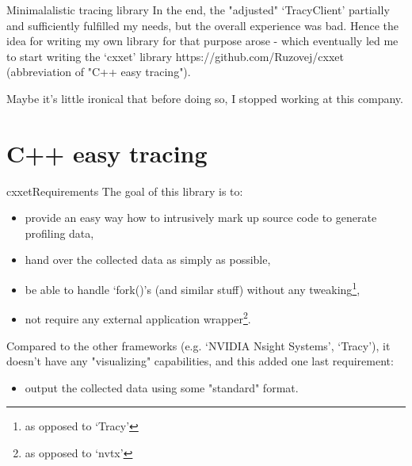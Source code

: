 \documentclass[aspectratio=169]{beamer}
\begin{document}
\begin{frame}{Minimalalistic tracing library}
    In the end, the "adjusted" `TracyClient' partially and sufficiently fulfilled my needs, but the overall experience was bad. Hence the idea for writing my own library for that purpose arose - which eventually led me to start writing the `cxxet' library https://github.com/Ruzovej/cxxet (abbreviation of "C++ easy tracing").
    
    Maybe it's little ironical that before doing so, I stopped working at this company.

\end{frame}


\section{C++ easy tracing}

\begin{frame}{cxxet}{Requirements}
    The goal of this library is to:
    
    \begin{itemize}
        \item \label{easy_usage} provide an easy way how to intrusively mark up source code to generate profiling data,
        \item \label{writing_out_data} hand over the collected data as simply as possible,
        \item \label{fork_handling} be able to handle `fork()'s (and similar stuff) without any tweaking\footnote{as opposed to `Tracy'},
        \item \label{no_external_wrapper} not require any external application wrapper\footnote{as opposed to `nvtx'}.
    \end{itemize}

    Compared to the other frameworks (e.g. `NVIDIA Nsight Systems', `Tracy'), it doesn't have any "visualizing" capabilities, and this added one last requirement:

    \begin{itemize}
        \item \label{data_format} output the collected data using some "standard" format.
    \end{itemize}

\end{frame}
\end{document}
